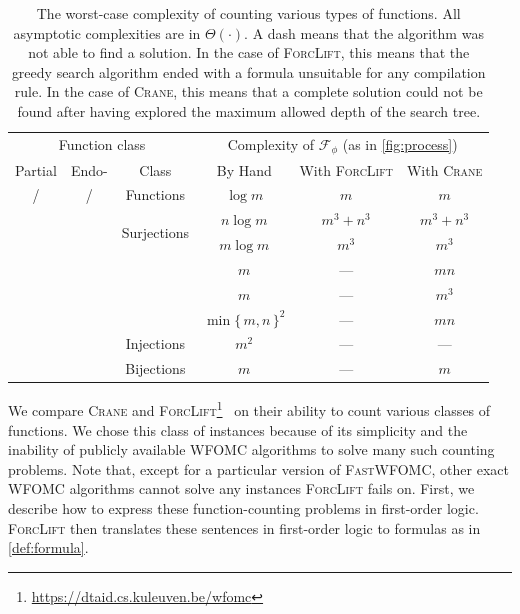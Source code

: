 \documentclass{article}
\newcommand{\cmark}{\ding{51}}%
\newcommand{\xmark}{\ding{55}}%
\begin{document}
\begin{table}[t]
  \centering
  \begin{tabular}{cccccc}
    \toprule
    \multicolumn{3}{c}{Function class} & \multicolumn{3}{c}{Complexity of $\mathcal{F}_{\phi}$ (as in \cref{fig:process})} \\
    Partial & Endo- & Class & By Hand & With \textsc{ForcLift} & With \textsc{Crane} \\
    \midrule
    \rowcolor{gray!25}\cmark/\xmark & \cmark/\xmark & Functions & $\log m$ & $m$ & $m$ \\
    \xmark & \xmark & \multirow{2}{*}{Surjections} & $n \log m$ & $m^{3}+n^{3}$ & $m^{3}+n^{3}$ \\
    \xmark & \cmark & & $m \log m$ & $m^{3}$ & $m^{3}$ \\
    \rowcolor{gray!25}\xmark & \xmark & & $m$ & --- & $mn$ \\
    \rowcolor{gray!25}\xmark & \cmark & & $m$ & --- & $m^3$ \\
    \rowcolor{gray!25}\cmark & \xmark & & ${\min\{\, m, n \,\}}^2$ & --- & $mn$ \\
    \rowcolor{gray!25}\cmark & \cmark & \multirow{-4}{*}{Injections} & $m^2$ & --- & --- \\
    \xmark & \xmark & Bijections & $m$ & --- & $m$ \\
    \bottomrule
  \end{tabular}
  \caption{The worst-case complexity of counting various types of functions. All
    asymptotic complexities are in $\Theta(\cdot)$. A dash means that the
    algorithm was not able to find a solution. In the case of \textsc{ForcLift},
    this means that the greedy search algorithm ended with a formula unsuitable
    for any compilation rule. In the case of \textsc{Crane}, this means that a
    complete solution could not be found after having explored the maximum
    allowed depth of the search tree.}\label{tbl:results}
\end{table}

We compare \textsc{Crane} and
\textsc{ForcLift}\footnote{\url{https://dtaid.cs.kuleuven.be/wfomc}}~\cite{DBLP:conf/ijcai/BroeckTMDR11}
on their ability to count various classes of functions. We chose this class of
instances because of its simplicity and the inability of publicly available
WFOMC algorithms to solve many such counting problems. Note that, except for a
particular version of \textsc{FastWFOMC}, other exact WFOMC algorithms cannot
solve any instances \textsc{ForcLift} fails on. First, we describe how to
express these function-counting problems in first-order logic. \textsc{ForcLift}
then translates these sentences in first-order logic to formulas as in
\cref{def:formula}.
\end{document}
